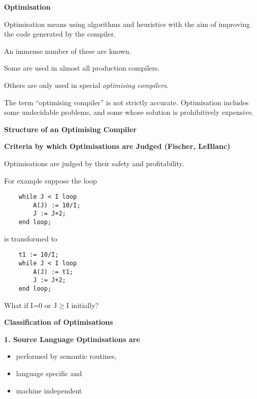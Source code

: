 \setcounter{slide}{110}
%
%
\begin{slide}{}
{\bf Optimisation}

Optimisation means using algorithms and heuristics with
the aim of improving the code generated by the compiler.

An immense number of these are known.

Some are used in almost all production compilers.

Others are only used in special {\em optimising compilers}.

The term ``optimising compiler'' is not strictly accurate.
Optimisation includes some undecidable problems, and some
whose solution is prohibitively expensive.
\end{slide}
%
%
\begin{slide}{}
{\bf Structure of an Optimising Compiler}

\vspace{3ex}

\end{slide}
%
%
\begin{slide}{}
{\bf Criteria by which Optimisations are Judged (Fischer, LeBlanc)}

Optimisations are judged by their
safety and profitability.

For example suppose the loop
\begin{verbatim}
    while J < I loop
        A(J) := 10/I;
        J := J+2;
    end loop;
\end{verbatim}
is transformed to
\begin{verbatim}
    t1 := 10/I;
    while J < I loop
        A(J) := t1;
        J := J+2;
    end loop;
\end{verbatim}

What if I=0 or J$\ge$I initially?

\end{slide}
%
%
\begin{slide}{}
{\bf Classification of Optimisations}

{\bf 1. Source Language Optimisations are}               
    \begin{itemize}
    \item performed by semantic routines,
    \item language specific and
    \item machine independent
    \end{itemize}
\end{slide}
